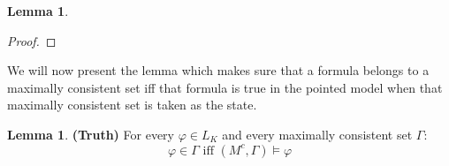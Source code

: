 \documentclass[12pt]{article}
\numberwithin{equation}{section}
\theoremstyle{definition}
\newtheorem{lem}[thm]{Lemma}
\theoremstyle{definition}
\theoremstyle{remark}
\begin{document}
\begin{lem}
\begin{enumerate}
\begin{proof}
    \end{proof}
    
\end{enumerate}

\end{lem}


We will now present the lemma which makes sure that a formula belongs to a maximally consistent set iff that formula is true in the pointed model when that maximally consistent set is taken as the state.

\begin{lem}

\textbf{(Truth)}
For every $\varphi \in L_K$ and every maximally consistent set $\Gamma$:
$$
\varphi \in \Gamma \text{ iff } ( M^c, \Gamma ) \models \varphi
$$

\end{lem}
\end{document}
